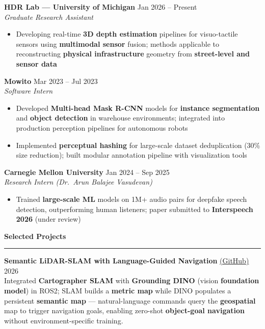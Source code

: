 \documentclass[9pt]{article}
\newcommand{\sect}[1]{\vspace{4pt}\noindent\textbf{\large #1}\vspace{3pt}\hrule\vspace{6pt}}
\begin{document}
\vspace{-1mm}
\textbf{HDR Lab --- University of Michigan} \hfill Jan 2026 -- Present\\
\emph{Graduate Research Assistant}
\vspace{-2mm}
\begin{itemize}[leftmargin=*,noitemsep,topsep=1pt]
  \item Developing real-time \textbf{3D depth estimation} pipelines for visuo-tactile sensors using \textbf{multimodal sensor} fusion; methods applicable to reconstructing \textbf{physical infrastructure} geometry from \textbf{street-level and sensor data}
\end{itemize}

\vspace{-1mm}
\textbf{Mowito} \hfill Mar 2023 -- Jul 2023\\
\emph{Software Intern}
\vspace{-2mm}
\begin{itemize}[leftmargin=*,noitemsep,topsep=1pt]
  \item Developed \textbf{Multi-head Mask R-CNN} models for \textbf{instance segmentation} and \textbf{object detection} in warehouse environments; integrated into production perception pipelines for autonomous robots
  \item Implemented \textbf{perceptual hashing} for large-scale dataset deduplication (30\% size reduction); built modular annotation pipeline with visualization tools
\end{itemize}

\vspace{-1mm}
\textbf{Carnegie Mellon University} \hfill Jan 2024 -- Sep 2025\\
\emph{Research Intern (Dr.\ Arun Balajee Vasudevan)}
\vspace{-2mm}
\begin{itemize}[leftmargin=*,noitemsep,topsep=1pt]
  \item Trained \textbf{large-scale ML} models on 1M+ audio pairs for deepfake speech detection, outperforming human listeners; paper submitted to \textbf{Interspeech 2026} (under review)
\end{itemize}

\sect{Selected Projects}

\textbf{Semantic LiDAR-SLAM with Language-Guided Navigation} \href{https://github.com/chittinvarunav/VLSGN_ROB530-Team21}{(GitHub)} \hfill 2026\\
Integrated \textbf{Cartographer SLAM} with \textbf{Grounding DINO} (vision \textbf{foundation model}) in ROS2; SLAM builds a \textbf{metric map} while DINO populates a persistent \textbf{semantic map} --- natural-language commands query the \textbf{geospatial} map to trigger navigation goals, enabling zero-shot \textbf{object-goal navigation} without environment-specific training.
\end{document}
